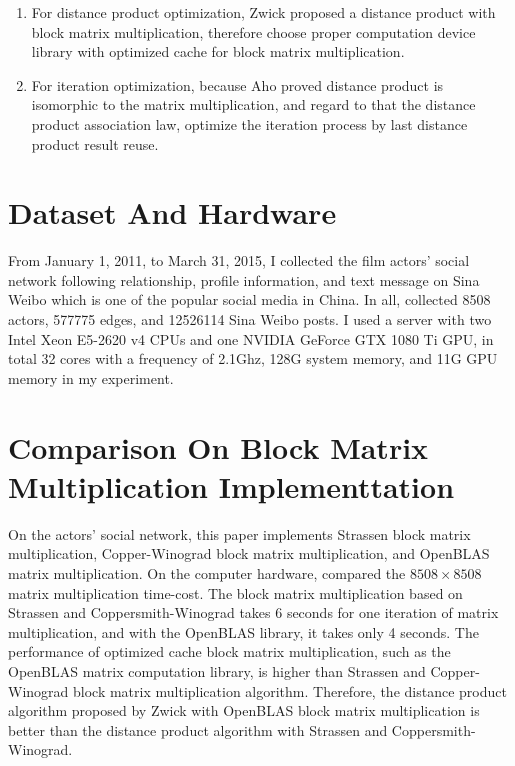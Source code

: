 \documentclass[review]{cvpr}
\begin{document}
\begin{enumerate}
\item For distance product optimization, Zwick proposed a distance product with block matrix multiplication, therefore choose proper computation device library with optimized cache for block matrix multiplication.
\item For iteration optimization, because Aho proved distance product is isomorphic to the matrix multiplication, and regard to that the distance product association law, optimize the iteration process by last distance product result reuse.
\end{enumerate}


\section{Dataset And Hardware}
From January 1, 2011, to March 31, 2015, I collected the film actors' social network following relationship, profile information, and text message on Sina Weibo which is one of the popular social media in China.
In all, collected 8508 actors, 577775 edges, and 12526114 Sina Weibo posts.
I used a server with two Intel Xeon E5-2620 v4 CPUs and one NVIDIA GeForce GTX 1080 Ti GPU, in total 32 cores with a frequency of 2.1Ghz, 128G system memory, and 11G GPU memory in my experiment.



\section{Comparison On Block Matrix Multiplication Implementtation}

On the actors' social network, this paper implements Strassen block matrix multiplication, Copper-Winograd block matrix multiplication, and OpenBLAS matrix multiplication.
On the computer hardware, compared the $8508\times 8508$ matrix multiplication time-cost.
The block matrix multiplication based on Strassen and Coppersmith-Winograd takes 6 seconds for one iteration of matrix multiplication, and with the OpenBLAS library, it takes only 4 seconds.
The performance of optimized cache block matrix multiplication, such as the OpenBLAS matrix computation library, is higher than Strassen and Copper-Winograd block matrix multiplication algorithm.
Therefore, the distance product algorithm proposed by Zwick with OpenBLAS block matrix multiplication is better than the distance product algorithm with Strassen and Coppersmith-Winograd.
\end{document}
